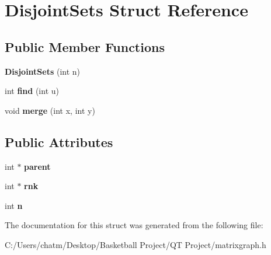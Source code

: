 \hypertarget{struct_disjoint_sets}{}\section{Disjoint\+Sets Struct Reference}
\label{struct_disjoint_sets}
\subsection*{Public Member Functions}
\begin{DoxyCompactItemize}
\item 
\mbox{\label{struct_disjoint_sets_a26da401bf4e56a876533c97643c7d9c2}} 
{\bfseries Disjoint\+Sets} (int n)
\item 
\mbox{\label{struct_disjoint_sets_a14ff5306079945dd59c0c6d55129ac2e}} 
int {\bfseries find} (int u)
\item 
\mbox{\label{struct_disjoint_sets_a349af3d249271920c355d9ef2a641f87}} 
void {\bfseries merge} (int x, int y)
\end{DoxyCompactItemize}
\subsection*{Public Attributes}
\begin{DoxyCompactItemize}
\item 
\mbox{\label{struct_disjoint_sets_ad7f9caf9365a04a1c6670aa372a3cdbd}} 
int $\ast$ {\bfseries parent}
\item 
\mbox{\label{struct_disjoint_sets_a93f26d80d2fb349bd97793fb41e502e8}} 
int $\ast$ {\bfseries rnk}
\item 
\mbox{\label{struct_disjoint_sets_aeb43c9e003e2bd5b83b5c60d56dfd23e}} 
int {\bfseries n}
\end{DoxyCompactItemize}


The documentation for this struct was generated from the following file\+:\begin{DoxyCompactItemize}
\item 
C\+:/\+Users/chatm/\+Desktop/\+Basketball Project/\+Q\+T Project/matrixgraph.\+h\end{DoxyCompactItemize}

